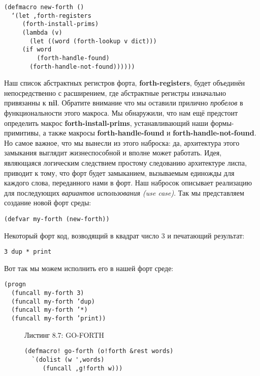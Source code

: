 \begin{verbatim}
(defmacro new-forth ()
  ‘(let ,forth-registers
     (forth-install-prims)
     (lambda (v)
       (let ((word (forth-lookup v dict)))
	 (if word
	     (forth-handle-found)
	   (forth-handle-not-found))))))
\end{verbatim}

Наш список абстрактных регистров форта, \textbf{forth-registers}, будет объединён непосредственно с расширением, где абстрактные регистры изначально привязанны к \textbf{nil}. Обратите внимание что мы оставили прилично \emph{пробелов} в функциональности этого макроса. Мы обнаружили, что нам ещё предстоит определить макрос \textbf{forth-install-prims}, устанавливающий наши формы-примитивы, а также макросы \textbf{forth-handle-found} и \textbf{forth-handle-not-found}. Но самое важное, что мы вынесли из этого наброска: да, архитектура этого замыкания выглядит жизнеспособной и вполне может работать. Идея, являющаяся логическим следствием простому следованию архитектуре лиспа, приводит к тому, что форт будет замыканием, вызываемым единожды для каждого слова, переданного нами в форт. Наш набросок описывает реализацию для последующих \emph{вариантов использования (use case)}. Так мы представляем создание новой форт среды:

\begin{verbatim}
(defvar my-forth (new-forth))
\end{verbatim}

Некоторый форт код, возводящий в квадрат число 3 и печатающий результат:

\begin{verbatim}
3 dup * print
\end{verbatim}

Вот так мы можем исполнить его в нашей форт среде:

\begin{verbatim}
(progn
  (funcall my-forth 3)
  (funcall my-forth ’dup)
  (funcall my-forth ’*)
  (funcall my-forth ’print))
\end{verbatim}

\begin{figure}Листинг 8.7: GO-FORTH\label{listing_8.7}
\listbegin
\begin{verbatim}
(defmacro! go-forth (o!forth &rest words)
  `(dolist (w ',words)
     (funcall ,g!forth w)))
\end{verbatim}
\listend
\end{figure}

